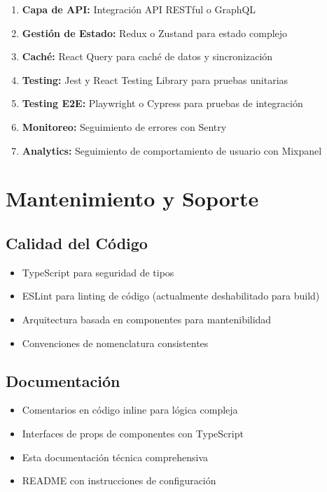 \documentclass[12pt,a4paper]{article}
\begin{document}
\begin{enumerate}
    \item \textbf{Capa de API:} Integración API RESTful o GraphQL
    \item \textbf{Gestión de Estado:} Redux o Zustand para estado complejo
    \item \textbf{Caché:} React Query para caché de datos y sincronización
    \item \textbf{Testing:} Jest y React Testing Library para pruebas unitarias
    \item \textbf{Testing E2E:} Playwright o Cypress para pruebas de integración
    \item \textbf{Monitoreo:} Seguimiento de errores con Sentry
    \item \textbf{Analytics:} Seguimiento de comportamiento de usuario con Mixpanel
\end{enumerate}

\section{Mantenimiento y Soporte}

\subsection{Calidad del Código}

\begin{itemize}
    \item TypeScript para seguridad de tipos
    \item ESLint para linting de código (actualmente deshabilitado para build)
    \item Arquitectura basada en componentes para mantenibilidad
    \item Convenciones de nomenclatura consistentes
\end{itemize}

\subsection{Documentación}

\begin{itemize}
    \item Comentarios en código inline para lógica compleja
    \item Interfaces de props de componentes con TypeScript
    \item Esta documentación técnica comprehensiva
    \item README con instrucciones de configuración
\end{itemize}
\end{document}
